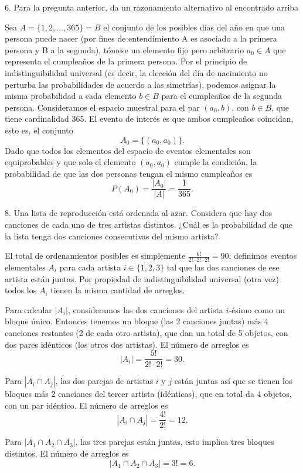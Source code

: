 6. Para la pregunta anterior, da un razonamiento alternativo al encontrado arriba

Sea \( A = \{1, 2, \ldots, 365\} = B \) el conjunto de los posibles días del año en que una persona puede nacer (por fines de entendimiento A es asociado a la primera persona y B a la segunda), tómese un elemento fijo pero arbitrario \( a_0 \in A \) que representa el cumpleaños de la primera persona.
Por el principio de indistinguibilidad universal (es decir, la elección del día de nacimiento no perturba las probabilidades de acuerdo a las simetrías), podemos asignar la misma probabilidad a cada elemento \( b \in B \) para el cumpleaños de la segunda persona.
Consideramos el espacio muestral para el par \((a_0, b)\), con \( b \in B \), que tiene cardinalidad 365.
El evento de interés es que ambos cumpleaños coincidan, esto es, el conjunto
\[
A_0 = \{(a_0, a_0)\}.
\]
Dado que todos los elementos del espacio de eventos elementales son equiprobables y que solo el elemento \((a_0, a_0)\) cumple la condición, la probabilidad de que las dos personas tengan el mismo cumpleaños es
\[
P(A_0) = \frac{|A_0|}{|A|} = \frac{1}{365}.
\]



8. Una lista de reproducción está ordenada al azar. Considera que hay dos canciones de cada uno de tres artistas distintos. ¿Cuál es la probabilidad de que la lista tenga dos canciones consecutivas del mismo artista?

El total de ordenamientos posibles es simplemente \( \frac{6!}{2! \cdot 2! \cdot 2!} = 90 \); definimos eventos elementales \(A_i\) para cada artista \(i \in \{1,2,3\}\) tal que las dos canciones de ese artista están juntas. Por propiedad de indistinguibilidad universal (otra vez) todos los \(A_i\) tienen la misma cantidad de arreglos.


Para calcular \(|A_i|\), consideramos las dos canciones del artista \(i\)-ésimo como un bloque único. Entonces tenemos un bloque (las 2 canciones juntas) más 4 canciones restantes (2 de cada otro artista), que dan un total de 5 objetos, con dos pares idénticos (los otros dos artistas). El número de arreglos es
\[
|A_i| = \frac{5!}{2! \cdot 2!} = 30.
\]


Para \(|A_i \cap A_j|\), las dos parejas de artistas \(i\) y \(j\) están juntas así que se tienen los bloques más 2 canciones del tercer artista (idénticas), que en total da 4 objetos, con un par idéntico. El número de arreglos es
\[
|A_i \cap A_j| = \frac{4!}{2!} = 12.
\]


Para \(|A_1 \cap A_2 \cap A_3|\), las tres parejas están juntas, esto implica tres bloques distintos. El número de arreglos es
\[
|A_1 \cap A_2 \cap A_3| = 3! = 6.
\]


